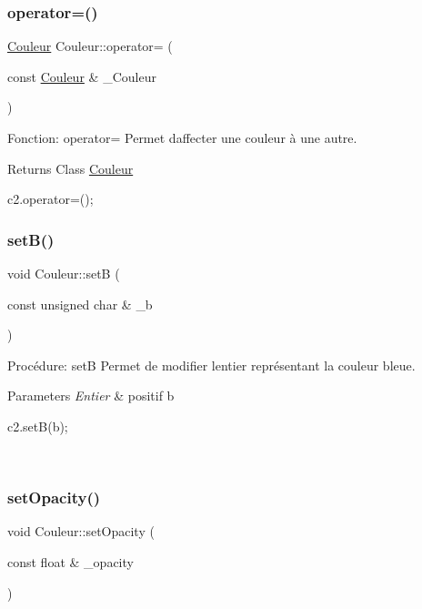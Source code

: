 \subsubsection{\texorpdfstring{operator=()}{operator=()}}
{\footnotesize\ttfamily \hyperlink{classCouleur}{Couleur} Couleur\+::operator= (\begin{DoxyParamCaption}\item[{const \hyperlink{classCouleur}{Couleur} \&}]{\+\_\+\+Couleur }\end{DoxyParamCaption})}



Fonction\+: operator= Permet d\textquotesingle{}affecter une couleur à une autre. 

\begin{DoxyReturn}{Returns}
Class \hyperlink{classCouleur}{Couleur} 
\begin{DoxyCode}
c2.operator=();
\end{DoxyCode}
 
\end{DoxyReturn}
\mbox{\label{classCouleur_ac598f1ad284ae2b59c5d781306ae9b0f}} 
\subsubsection{\texorpdfstring{set\+B()}{setB()}}
{\footnotesize\ttfamily void Couleur\+::setB (\begin{DoxyParamCaption}\item[{const unsigned char \&}]{\+\_\+b }\end{DoxyParamCaption})}



Procédure\+: setB Permet de modifier l\textquotesingle{}entier représentant la couleur bleue. 


\begin{DoxyParams}{Parameters}
{\em Entier} & positif b 
\begin{DoxyCode}
c2.setB(b);
\end{DoxyCode}
 \\
\hline
\end{DoxyParams}
\mbox{\label{classCouleur_a54817aff2a5f8d5dfcf6358d523c923a}} 
\subsubsection{\texorpdfstring{set\+Opacity()}{setOpacity()}}
{\footnotesize\ttfamily void Couleur\+::set\+Opacity (\begin{DoxyParamCaption}\item[{const float \&}]{\+\_\+opacity }\end{DoxyParamCaption})}



